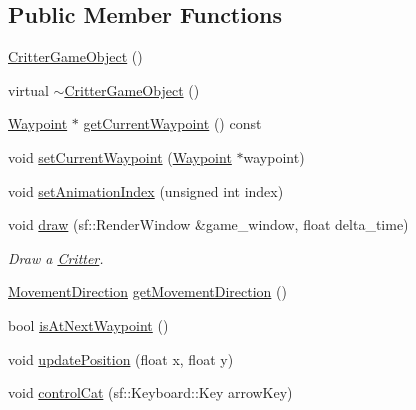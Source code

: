 \subsection*{Public Member Functions}
\begin{DoxyCompactItemize}
\item 
\hyperlink{class_critter_game_object_afbffc1b3ab985afd2a71f7a66808af62}{Critter\+Game\+Object} ()
\item 
virtual \hyperlink{class_critter_game_object_ab1af097b88647066731e22898a7b1697}{$\sim$\+Critter\+Game\+Object} ()
\item 
\hyperlink{class_waypoint}{Waypoint} $\ast$ \hyperlink{class_critter_game_object_a1b81867b7f6a204a4c9982da18bb9d0a}{get\+Current\+Waypoint} () const 
\item 
void \hyperlink{class_critter_game_object_a6302cd7be6a4f1d3d724cb0e45941338}{set\+Current\+Waypoint} (\hyperlink{class_waypoint}{Waypoint} $\ast$waypoint)
\item 
void \hyperlink{class_critter_game_object_afea351babd57c739104879f27dafd910}{set\+Animation\+Index} (unsigned int index)
\item 
void \hyperlink{class_critter_game_object_a87b34231710c3537c9691e2034502269}{draw} (sf\+::\+Render\+Window \&game\+\_\+window, float delta\+\_\+time)
\begin{DoxyCompactList}\small\item\em Draw a \hyperlink{class_critter}{Critter}. \end{DoxyCompactList}\item 
\hyperlink{class_critter_game_object_a8d07276919d937f6066395bc0e1febf2}{Movement\+Direction} \hyperlink{class_critter_game_object_a3ce69ef5cbc8983b45df839674aab0bc}{get\+Movement\+Direction} ()
\item 
bool \hyperlink{class_critter_game_object_abdc7d3071ef2e9e00c277051f62b9005}{is\+At\+Next\+Waypoint} ()
\item 
void \hyperlink{class_critter_game_object_a546fa242023f61965a284e4a2e72ab7d}{update\+Position} (float x, float y)
\item 
void \hyperlink{class_critter_game_object_aade350efb5f7c65da8eb66d01c65be6f}{control\+Cat} (sf\+::\+Keyboard\+::\+Key arrow\+Key)
\end{DoxyCompactItemize}
